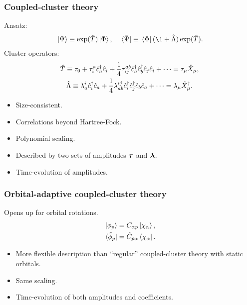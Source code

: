 \documentclass{beamer}
\begin{document}
\begin{frame}
    \frametitle{Coupled-cluster theory}
    Ansatz:
    \begin{gather}
        \ket*{\Psi} \equiv \exponential(\clust)\ket*{\slat},
        \quad
        \bra*{\tilde{\Psi}} \equiv
        \bra*{\slat}(\1 + \clustl)\exponential(\clust).
    \end{gather}
    Cluster operators:
    \begin{gather}
        \hat{T} \equiv \tau_0
        + \tau^{a}_{i}\hat{c}_{a}^{\dagger}\hat{c}_{i}
        + \frac{1}{4}\tau^{ab}_{ij}\hat{c}_{a}^{\dagger}\hat{c}_{b}^{\dagger}\hat{c}_{j}\hat{c}_{i}
        + \dots
        = \tau_{\mu}\hat{X}_{\mu},
        \\
        \hat{\Lambda} \equiv
        \lambda^{i}_{a}\hat{c}_{i}^{\dagger}\hat{c}_{a}
        + \frac{1}{4}\lambda^{ij}_{ab}\hat{c}_{i}^{\dagger}\hat{c}_{j}^{\dagger}\hat{c}_{b}\hat{c}_{a}
        + \dots
        = \lambda_{\mu}\hat{X}^{\dagger}_{\mu}.
    \end{gather}
    \begin{itemize}
        \item Size-consistent.
        \item Correlations beyond Hartree-Fock.
        \item Polynomial scaling.
        \item Described by two sets of amplitudes $\boldsymbol{\tau}$ and
            $\boldsymbol{\lambda}$.
        \item Time-evolution of amplitudes.
    \end{itemize}
\end{frame}

\begin{frame}
    \frametitle{Orbital-adaptive coupled-cluster theory}
    Opens up for orbital rotations.
    \begin{gather}
        \ket*{\phi_p} = C_{\alpha p}\ket*{\chi_{\alpha}}, \\
        \bra*{\tilde{\phi}_{p}} = \tilde{C}_{p \alpha} \bra*{\chi_{\alpha}}.
    \end{gather}
    \begin{itemize}
        \item More flexible description than ``regular'' coupled-cluster theory
            with static orbitals.
        \item Same scaling.
        \item Time-evolution of both amplitudes and coefficients.
    \end{itemize}
\end{frame}
\end{document}
